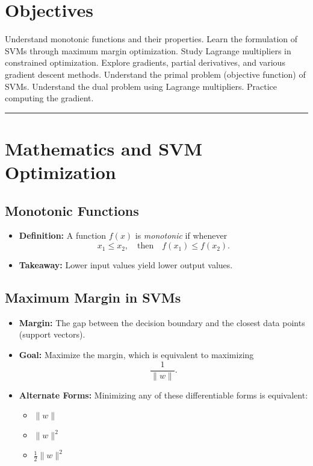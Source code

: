 
\section*{Objectives}
\begin{outline}
    \1 Understand monotonic functions and their properties.
    \1 Learn the formulation of SVMs through maximum margin optimization.
    \1 Study Lagrange multipliers in constrained optimization.
    \1 Explore gradients, partial derivatives, and various gradient descent methods.
    \1 Understand the primal problem (objective function) of SVMs.
    \1 Understand the dual problem using Lagrange multipliers.
    \1 Practice computing the gradient.
\end{outline}

\rule[0.0051in]{\textwidth}{0.00025in}

\section{Mathematics and SVM Optimization}

\subsection{Monotonic Functions}
\begin{itemize}
    \item \textbf{Definition:} A function \( f(x) \) is \emph{monotonic} if whenever 
    \[
    x_1 \leq x_2, \quad \text{then} \quad f(x_1) \leq f(x_2).
    \]
    \item \textbf{Takeaway:} Lower input values yield lower output values.
\end{itemize}

\subsection{Maximum Margin in SVMs}
\begin{itemize}
    \item \textbf{Margin:} The gap between the decision boundary and the closest data points (support vectors).
    \item \textbf{Goal:} Maximize the margin, which is equivalent to maximizing 
    \[
    \frac{1}{\|w\|}.
    \]
    \item \textbf{Alternate Forms:} Minimizing any of these differentiable forms is equivalent:
    \begin{itemize}
        \item \(\|w\|\)
        \item \(\|w\|^2\)
        \item \(\frac{1}{2}\|w\|^2\)
    \end{itemize}
\end{itemize}


